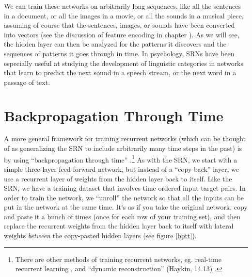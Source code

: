  We can train these networks on arbitrarily long sequences, like all the sentences in a document, or all the images in a movie, or all the sounds in a musical piece, assuming of course that the sentences, images, or sounds have been converted into vectors (see the discussion of feature encoding in chapter ). As we will see, the hidden layer can then be  analyzed for the patterns it discovers and the sequences of patterns it goes through in time. In psychology, SRNs have been especially useful at studying the development of linguistic categories in networks that learn to predict the next sound in a speech stream, or the next word in a passage of text.

\section{Backpropagation Through Time}




A more general framework for training recurrent networks (which can be thought of as generalizing the SRN to include arbitrarily many time steps in the past) is by using ``backpropagation through time'' \cite{werbos1990bptt}.\footnote{There are other methods of training recurrent networks, eg. real-time recurrent learning \cite{williams1989learning}, and ``dynamic reconstruction'' (Haykin, 14.13) \cite{haykin1998neural}.} As with the SRN, we start with a simple three-layer feed-forward network, but instead of a ``copy-back''  layer, we use a recurrent layer of weights from the hidden layer back to itself. Like the SRN, we have a training dataset that involves time ordered input-target pairs. In order to train the network, we ``unroll'' the network so that all the inputs can be put in the network at the same time. It's as if you take the original network, copy and paste it a bunch of times (once for each row of your training set), and then replace the recurrent weights from the hidden layer back to itself with lateral weights \emph{between} the copy-pasted hidden layers (see figure \ref{bptt}). 

